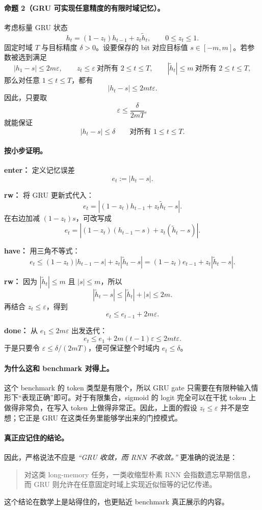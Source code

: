 \documentclass[12pt,a4paper]{ctexart}
\begin{document}
\paragraph{命题 2（GRU 可实现任意精度的有限时域记忆）。}
考虑标量 GRU 状态
\[
h_t = (1-z_t)h_{t-1} + z_t \tilde h_t,
\qquad 0 \le z_t \le 1.
\]
固定时域 \(T\) 与目标精度 \(\delta > 0\)。设要保存的 bit 对应目标值 \(s \in [-m,m]\)。若参数被选到满足
\[
|h_1-s| \le 2m\varepsilon,
\qquad
z_t \le \varepsilon \ \text{对所有 } 2 \le t \le T,
\qquad
|\tilde h_t| \le m \ \text{对所有 } 2 \le t \le T,
\]
那么对任意 \(1 \le t \le T\)，都有
\[
|h_t-s| \le 2mt\varepsilon.
\]
因此，只要取
\[
\varepsilon \le \frac{\delta}{2mT},
\]
就能保证
\[
|h_t-s| \le \delta
\qquad
\text{对所有 } 1 \le t \le T.
\]

\paragraph{按小步证明。}
\textbf{enter：} 定义记忆误差
\[
e_t := |h_t-s|.
\]

\textbf{rw：} 将 GRU 更新式代入：
\[
e_t
=
\left|(1-z_t)h_{t-1} + z_t \tilde h_t - s\right|.
\]
在右边加减 \((1-z_t)s\)，可改写成
\[
e_t
=
\left|(1-z_t)(h_{t-1}-s) + z_t(\tilde h_t-s)\right|.
\]

\textbf{have：} 用三角不等式：
\[
e_t
\le
(1-z_t)|h_{t-1}-s| + z_t|\tilde h_t-s|
=
(1-z_t)e_{t-1} + z_t|\tilde h_t-s|.
\]

\textbf{rw：} 因为 \(|\tilde h_t| \le m\) 且 \(|s| \le m\)，所以
\[
|\tilde h_t-s| \le |\tilde h_t| + |s| \le 2m.
\]
再结合 \(z_t \le \varepsilon\)，得到
\[
e_t \le e_{t-1} + 2m\varepsilon.
\]

\textbf{done：} 从 \(e_1 \le 2m\varepsilon\) 出发迭代：
\[
e_t
\le
e_1 + 2m(t-1)\varepsilon
\le
2mt\varepsilon.
\]
于是只要令 \(\varepsilon \le \delta/(2mT)\)，便可保证整个时域内 \(e_t \le \delta\)。

\paragraph{为什么这和 benchmark 对得上。}
这个 benchmark 的 token 类型是有限个，所以 GRU gate 只需要在有限种输入情形下“表现正确”即可。对于有限集合，sigmoid 的 logit 完全可以在干扰 token 上做得非常负，在写入 token 上做得非常正。因此，上面的假设 \(z_t \le \varepsilon\) 并不是空想；它正是 GRU 在这类任务里能够学出来的门控模式。

\paragraph{真正应记住的结论。}
因此，严格说法不应是
\emph{“GRU 收敛，而 RNN 不收敛。”}
更准确的说法是：
\begin{quote}
对这类 long-memory 任务，一类收缩型朴素 RNN 会指数遗忘早期信息，而 GRU 则允许在任意固定时域上实现近似恒等的记忆传递。
\end{quote}
这个结论在数学上是站得住的，也更贴近 benchmark 真正展示的内容。
\end{document}
